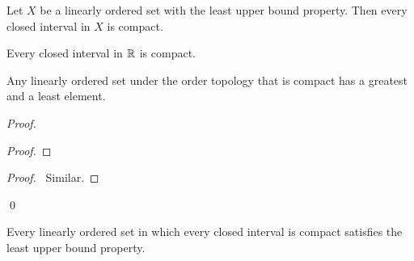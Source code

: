\begin{corollary}
    \label{corollary:closed_interval_compact}
    Let $X$ be a linearly ordered set with the least upper bound property. Then every closed interval in $X$ is compact.
\end{corollary}

\begin{corollary}
    Every closed interval in $\mathbb{R}$ is compact.
\end{corollary}

\begin{theorem}
    Any linearly ordered set under the order topology that is compact has
    a greatest and a least element.
\end{theorem}

\begin{proof}
    \pf
    \begin{proof}
    \end{proof}
    \begin{proof}
        \pf\ Similar.
    \end{proof}
    \qed
\end{proof}

\begin{proposition}
    Every linearly ordered set in which every closed interval is compact
    satisfies the least upper bound property.
\end{proposition}

